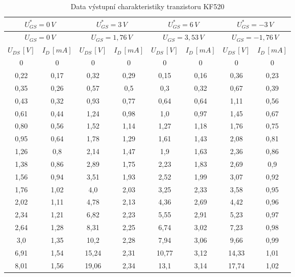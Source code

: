 \documentclass[12pt]{article} %
\begin{document}
\begin{table}[H]
\caption{Data výstupní charakteristiky tranzistoru KF520}
\begin{tabular}{|c|c||c|c||c|c||c|c|}
\hline 
\multicolumn{2}{|c|}{$U_{GS}^*=0\,V$} & \multicolumn{2}{|c|}{$U_{GS}^*=3\,V$} & \multicolumn{2}{|c|}{$U_{GS}^*=6\,V$} & \multicolumn{2}{|c|}{$U_{GS}^*=-3\,V$} \\ 
\hline 
\multicolumn{2}{|c|}{$U_{GS}=0\,V$} & \multicolumn{2}{|c|}{$U_{GS}=1,76\,V$} & \multicolumn{2}{|c|}{$U_{GS}=3,53\,V$} & \multicolumn{2}{|c|}{$U_{GS}=-1,76\,V$} \\ 
\hline 
$U_{DS}\,[V]$ & $I_D\,[mA]$ & $U_{DS}\,[V]$ & $I_D\,[mA]$ & $U_{DS}\,[V]$ & $I_D\,[mA]$ & $U_{DS}\,[V]$ & $I_D\,[mA]$ \\ 
\hline 
0 & 0 & 0 & 0 & 0 & 0 & 0 & 0 \\ 
\hline 
0,22 & 0,17 & 0,32 & 0,29 & 0,15 & 0,16 & 0,36 & 0,23 \\ 
\hline 
0,35 & 0,26 & 0,57 & 0,5 & 0,3 & 0,32 & 0,67 & 0,39 \\ 
\hline 
0,43 & 0,32 & 0,93 & 0,77 & 0,64 & 0,64 & 1,11 & 0,56 \\ 
\hline 
0,61 & 0,44 & 1,24 & 0,98 & 1,0 & 0,97 & 1,45 & 0,67 \\ 
\hline 
0,80 & 0,56 & 1,52 & 1,14 & 1,27 & 1,18 & 1,76 & 0,75 \\ 
\hline 
0,95 & 0,64 & 1,78 & 1,29 & 1,61 & 1,43 & 2,08 & 0,81 \\ 
\hline 
1,26 & 0,8 & 2,14 & 1,47 & 1,9 & 1,63 & 2,36 & 0,86 \\ 
\hline 
1,38 & 0,86 & 2,89 & 1,75 & 2,23 & 1,83 & 2,69 & 0,9 \\ 
\hline 
1,56 & 0,94 & 3,51 & 1,93 & 2,52 & 1,99 & 3,07 & 0,92 \\ 
\hline 
1,76 & 1,02 & 4,0 & 2,03 & 3,25 & 2,33 & 3,58 & 0,95 \\ 
\hline 
2,02 & 1,11 & 4,78 & 2,13 & 4,36 & 2,69 & 4,42 & 0,96 \\ 
\hline 
2,34 & 1,21 & 6,82 & 2,23 & 5,55 & 2,91 & 5,23 & 0,97 \\ 
\hline 
2,64 & 1,28 & 8,31 & 2,25 & 6,74 & 3,02 & 7,23 & 0,98 \\ 
\hline 
3,0 & 1,35 & 10,2 & 2,28 & 7,94 & 3,06 & 9,66 & 0,99 \\ 
\hline 
6,91 & 1,54 & 15,24 & 2,31 & 10,77 & 3,12 & 14,33 & 1,01 \\ 
\hline 
8,01 & 1,56 & 19,06 & 2,34 & 13,1 & 3,14 & 17,74 & 1,02 \\ 
\hline 
\end{tabular} 
\end{table}
\end{document}
